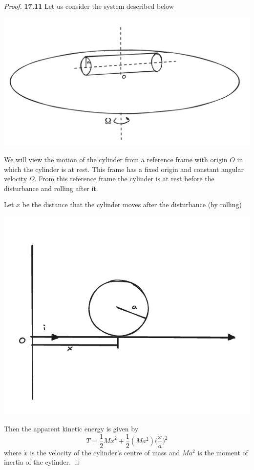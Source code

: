 \documentclass[11pt]{article}
\theoremstyle{definition}
\begin{document}
\begin{proof}{\textbf{17.11}}
    Let us consider the system described below
    \begin{center}
        \includegraphics[scale=0.3]{ch17-11.png}
    \end{center}
    We will view the motion of the cylinder from a reference frame with origin
    $O$ in which the cylinder is at rest.
    This frame has a fixed origin and constant angular velocity $\Omega$.
    From this reference frame the cylinder is at rest before the disturbance
    and rolling after it.

    Let $x$ be the distance that the cylinder moves after the disturbance
    (by rolling)
    \begin{center}
        \includegraphics[scale=0.3]{ch17-11-1.png}
    \end{center}   
    Then the apparent kinetic energy is given by
    $$T = \frac{1}{2}M\dot x^2
    + \frac{1}{2}(M a^2)\bigg(\frac{\dot x}{a}\bigg)^2$$
    where $\dot x$ is the velocity of the cylinder's centre of mass and $Ma^2$
    is the moment of inertia of the cylinder.


\end{proof}
\end{document}

